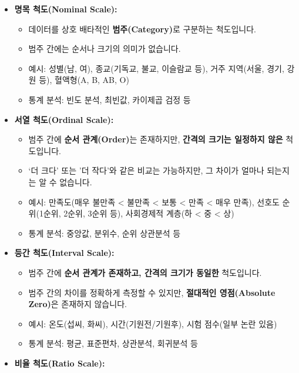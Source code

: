 \documentclass[
  letterpaper,
]{book}
\providecommand{\tightlist}{%
  \setlength{\itemsep}{0pt}\setlength{\parskip}{0pt}}
\begin{document}
\begin{itemize}
  \begin{itemize}
  \tightlist
  \item
    \textbf{명목 척도(Nominal Scale):}

    \begin{itemize}
    \tightlist
    \item
      데이터를 상호 배타적인 \textbf{범주(Category)}로 구분하는
      척도입니다.
    \item
      범주 간에는 순서나 크기의 의미가 없습니다.
    \item
      예시: 성별(남, 여), 종교(기독교, 불교, 이슬람교 등), 거주
      지역(서울, 경기, 강원 등), 혈액형(A, B, AB, O)
    \item
      통계 분석: 빈도 분석, 최빈값, 카이제곱 검정 등
    \end{itemize}
  \item
    \textbf{서열 척도(Ordinal Scale):}

    \begin{itemize}
    \tightlist
    \item
      범주 간에 \textbf{순서 관계(Order)}는 존재하지만, \textbf{간격의
      크기는 일정하지 않은} 척도입니다.
    \item
      `더 크다' 또는 '더 작다'와 같은 비교는 가능하지만, 그 차이가
      얼마나 되는지는 알 수 없습니다.
    \item
      예시: 만족도(매우 불만족 \textless{} 불만족 \textless{} 보통
      \textless{} 만족 \textless{} 매우 만족), 선호도 순위(1순위, 2순위,
      3순위 등), 사회경제적 계층(하 \textless{} 중 \textless{} 상)
    \item
      통계 분석: 중앙값, 분위수, 순위 상관분석 등
    \end{itemize}
  \item
    \textbf{등간 척도(Interval Scale):}

    \begin{itemize}
    \tightlist
    \item
      범주 간에 \textbf{순서 관계가 존재하고, 간격의 크기가 동일한}
      척도입니다.
    \item
      범주 간의 차이를 정확하게 측정할 수 있지만, \textbf{절대적인
      영점(Absolute Zero)}은 존재하지 않습니다.
    \item
      예시: 온도(섭씨, 화씨), 시간(기원전/기원후), 시험 점수(일부 논란
      있음)
    \item
      통계 분석: 평균, 표준편차, 상관분석, 회귀분석 등
    \end{itemize}
  \item
    \textbf{비율 척도(Ratio Scale):}


\end{itemize}
\end{itemize}
\end{document}

